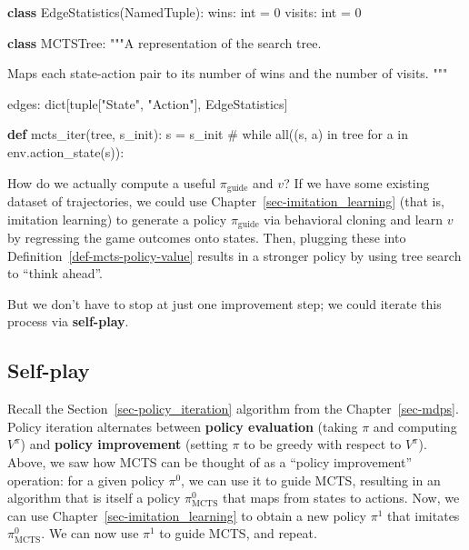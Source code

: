 \documentclass[
  letterpaper,
  DIV=11,
  numbers=noendperiod]{scrreprt}
\newenvironment{Shaded}{\begin{snugshade}}{\end{snugshade}}
\newcommand{\BuiltInTok}[1]{\textcolor[rgb]{0.00,0.23,0.31}{#1}}
\newcommand{\CommentTok}[1]{\textcolor[rgb]{0.37,0.37,0.37}{#1}}
\newcommand{\DecValTok}[1]{\textcolor[rgb]{0.68,0.00,0.00}{#1}}
\newcommand{\KeywordTok}[1]{\textcolor[rgb]{0.00,0.23,0.31}{\textbf{#1}}}
\newcommand{\NormalTok}[1]{\textcolor[rgb]{0.00,0.23,0.31}{#1}}
\newcommand{\OperatorTok}[1]{\textcolor[rgb]{0.37,0.37,0.37}{#1}}
\newcommand{\StringTok}[1]{\textcolor[rgb]{0.13,0.47,0.30}{#1}}
\theoremstyle{plain}
\theoremstyle{plain}
\theoremstyle{definition}
\theoremstyle{definition}
\theoremstyle{remark}
\begin{document}
\begin{Shaded}
\begin{Highlighting}[]
\KeywordTok{class}\NormalTok{ EdgeStatistics(NamedTuple):}
\NormalTok{    wins: }\BuiltInTok{int} \OperatorTok{=} \DecValTok{0}
\NormalTok{    visits: }\BuiltInTok{int} \OperatorTok{=} \DecValTok{0}

\KeywordTok{class}\NormalTok{ MCTSTree:}
    \CommentTok{"""A representation of the search tree.}

\CommentTok{    Maps each state{-}action pair to its number of wins and the number of visits.}
\CommentTok{    """}

\NormalTok{    edges: }\BuiltInTok{dict}\NormalTok{[}\BuiltInTok{tuple}\NormalTok{[}\StringTok{"State"}\NormalTok{, }\StringTok{"Action"}\NormalTok{], EdgeStatistics]}

\KeywordTok{def}\NormalTok{ mcts\_iter(tree, s\_init):}
\NormalTok{    s }\OperatorTok{=}\NormalTok{ s\_init}
    \CommentTok{\# while all((s, a) in tree for a in env.action\_state(s)):}
\end{Highlighting}
\end{Shaded}

How do we actually compute a useful \(\pi_\text{guide}\) and \(v\)? If
we have some existing dataset of trajectories, we could use
Chapter~\ref{sec-imitation_learning} (that is, imitation learning) to
generate a policy \(\pi_\text{guide}\) via behavioral cloning and learn
\(v\) by regressing the game outcomes onto states. Then, plugging these
into Definition~\ref{def-mcts-policy-value} results in a stronger policy
by using tree search to ``think ahead''.

But we don't have to stop at just one improvement step; we could iterate
this process via \textbf{self-play}.

\subsection{Self-play}\label{self-play}

Recall the Section~\ref{sec-policy_iteration} algorithm from the
Chapter~\ref{sec-mdps}. Policy iteration alternates between
\textbf{policy evaluation} (taking \(\pi\) and computing \(V^\pi\)) and
\textbf{policy improvement} (setting \(\pi\) to be greedy with respect
to \(V^\pi\)). Above, we saw how MCTS can be thought of as a ``policy
improvement'' operation: for a given policy \(\pi^0\), we can use it to
guide MCTS, resulting in an algorithm that is itself a policy
\(\pi^0_\text{MCTS}\) that maps from states to actions. Now, we can use
Chapter~\ref{sec-imitation_learning} to obtain a new policy \(\pi^1\)
that imitates \(\pi^0_\text{MCTS}\). We can now use \(\pi^1\) to guide
MCTS, and repeat.
\end{document}
